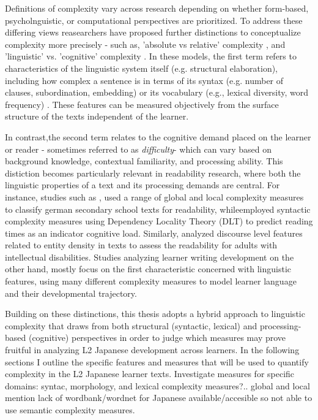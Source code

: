 Definitions of complexity vary across research depending on whether form-based, psycholnguistic, or computational
perspectives are prioritized. To address these differing views reasearchers have proposed further distinctions
to conceptualize complexity more precisely - such as, 'absolute vs relative' complexity
\citet{Miestamo2008, Butle2012}, and
'linguistic' vs. 'cognitive' complexity \cite{housen2009}. In these models, the first term refers to characteristics
of the linguistic system itself (e.g. structural elaboration), including how complex a sentence is in terms of its
syntax (e.g. number of clauses, subordination, embedding) or its vocabulary (e.g., lexical diversity, word frequency)
. These features can be measured objectively from the surface structure of the texts independent of the learner.


In contrast,the second term relates to the cognitive demand placed on the learner or reader - sometimes referred to as \emph{difficulty}- which can vary based on background knowledge, contextual familiarity, and processing ability. This distiction becomes particularly relevant in readability research, where both the linguistic properties of a text and its processing demands are central. For instance, studies such as \citet{Berendes2018}, used a range of global and local complexity measures to classify german secondary school texts for readability, while\citet{shain2016}employed syntactic complexity measures using Dependency Locality Theory (DLT) to predict reading times as an indicator cognitive load. Similarly, \citet{Feng2009} analyzed discourse level features related to entity density in texts to assess the readability for adults with intellectual disabilities. Studies analyzing learner writing development on the other hand, mostly focus on the first characteristic concerned with linguistic features, using many different complexity measures to model learner language and their developmental trajectory\cite{Lu2010,Lu2011,Vyatkina2012,weiss2019,Iwashita2006,Wolfe1998, Ortega2003,NorrisOrtega2009}.

Building on these distinctions, this thesis adopts a hybrid approach to linguistic complexity that draws from both
structural (syntactic, lexical) and processing-based (cognitive) perspectives in order to judge which measures may
prove fruitful in analyzing L2 Japanese development across learners. In
the following
sections I outline
the specific features and measures that will be used to quantify complexity in the L2 Japanese learner texts.
Investigate measures for specific domains: syntac, morphology, and lexical complexity measures?.. global and local
mention lack of wordbank/wordnet for Japanese available/accesible so not able to use semantic complexity measures.

